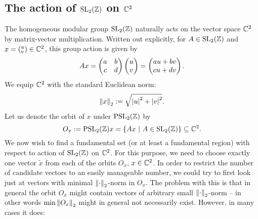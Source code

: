 \subsection{The action of $\operatorname{SL}_{2}(\mathbb{Z})$ on $\mathbb{C}^2$}

The homogeneous modular group $\operatorname{SL}_{2}(\mathbb{Z})$ naturally acts on the vector space $\mathbb{C}^2$ by matrix-vector multiplication. Written out explicitly, for $A \in \operatorname{SL}_{2}(\mathbb{Z})$ and $x = ({}^u_v) \in \mathbb{C}^2$, this group action is given by
\begin{equation*}
A x = \begin{pmatrix}a & b \\ c & d\end{pmatrix} \begin{pmatrix}u \\ v\end{pmatrix} = \begin{pmatrix}a u + b v \\ c u + d v\end{pmatrix}.
\end{equation*}
We equip $\mathbb{C}^2$ with the standard Euclidean norm: 
\begin{equation*}
\left\| x \right\|_2 := \sqrt{\left|u\right|^2 + \left|v\right|^2}.
\end{equation*}
Let us denote the orbit of $x$ under $\operatorname{PSL}_{2}(\mathbb{Z})$ by 
\begin{equation}
O_x := \operatorname{PSL}_{2}(\mathbb{Z}) x = \{ Ax \ | \ A \in \operatorname{SL}_{2}(\mathbb{Z}) \} \subseteq \mathbb{C}^2.
\end{equation}
We now wish to find a fundamental set (or at least a fundamental region) with respect to action of $\operatorname{SL}_{2}(\mathbb{Z})$ on $\mathbb{C}^2$. For this purpose, we need to choose exactly one vector $\tilde{x}$ from each of the orbits $O_x$, $x \in \mathbb{C}^2$. In order to restrict the number of candidate vectors to an easily manageable number, we could try to first look just at vectors with minimal $\left\| \cdot \right\|_2$-norm in $O_x$. The problem with this is that in general the orbit $O_x$ might contain vectors of arbitrary small $\left\| \cdot \right\|_2$-norm -- in other words $\min{\left\| O_x \right\|_2}$ might in general not necessarily exist. However, in many cases it does:

